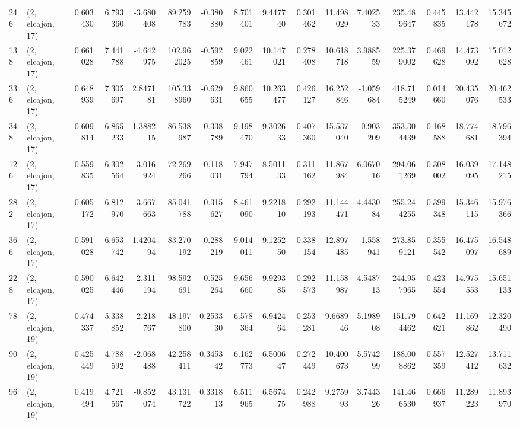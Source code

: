 \begin{tabular}{llrrrrrrrrrrrrrr}
246 &  (2, elcajon, 17) &   0.603430 &   6.793360 &  -3.680408 &    89.259783 &  -0.380880 &   8.701401 &   9.447740 &  0.301462 &  11.498029 &   7.402533 &   235.489647 &  0.445835 &  13.442178 &  15.345672 \\
138 &  (2, elcajon, 17) &   0.661028 &   7.441788 &  -4.642975 &   102.962025 &  -0.592859 &   9.022461 &  10.147021 &  0.278408 &  10.618718 &   3.988559 &   225.379002 &  0.469628 &  14.473092 &  15.012628 \\
336 &  (2, elcajon, 17) &   0.648939 &   7.305697 &   2.847181 &   105.338960 &  -0.629631 &   9.860655 &  10.263477 &  0.426127 &  16.252846 &  -1.059684 &   418.715249 &  0.014660 &  20.435076 &  20.462533 \\
348 &  (2, elcajon, 17) &   0.609814 &   6.865233 &   1.388215 &    86.538987 &  -0.338789 &   9.198470 &   9.302633 &  0.407360 &  15.537040 &  -0.903209 &   353.304439 &  0.168588 &  18.774681 &  18.796394 \\
126 &  (2, elcajon, 17) &   0.559835 &   6.302564 &  -3.016924 &    72.269266 &  -0.118031 &   7.947794 &   8.501133 &  0.311162 &  11.867984 &   6.067016 &   294.061269 &  0.308002 &  16.039095 &  17.148215 \\
282 &  (2, elcajon, 17) &   0.605172 &   6.812970 &  -3.667663 &    85.041788 &  -0.315627 &   8.461090 &   9.221810 &  0.292193 &  11.144471 &   4.443084 &   255.244255 &  0.399348 &  15.346115 &  15.976366 \\
366 &  (2, elcajon, 17) &   0.591028 &   6.653742 &   1.420494 &    83.270192 &  -0.288219 &   9.014011 &   9.125250 &  0.338154 &  12.897485 &  -1.558941 &   273.859121 &  0.355542 &  16.475097 &  16.548689 \\
228 &  (2, elcajon, 17) &   0.590025 &   6.642446 &  -2.311194 &    98.592691 &  -0.525264 &   9.656660 &   9.929385 &  0.292573 &  11.158987 &   4.548713 &   244.957965 &  0.423554 &  14.975553 &  15.651133 \\
78  &  (2, elcajon, 19) &   0.474337 &   5.338852 &  -2.218767 &    48.197800 &   0.253330 &   6.578364 &   6.942464 &  0.253281 &   9.668946 &   5.198908 &   151.794462 &  0.642621 &  11.169862 &  12.320490 \\
90  &  (2, elcajon, 19) &   0.425449 &   4.788592 &  -2.068488 &    42.258411 &   0.345342 &   6.162773 &   6.500647 &  0.272449 &  10.400673 &   5.574299 &   188.008862 &  0.557359 &  12.527412 &  13.711632 \\
96  &  (2, elcajon, 19) &   0.419494 &   4.721567 &  -0.852074 &    43.131722 &   0.331813 &   6.511965 &   6.567475 &  0.242988 &   9.275993 &   3.744326 &   141.466530 &  0.666937 &  11.289223 &  11.893970 \\

\end{tabular}
